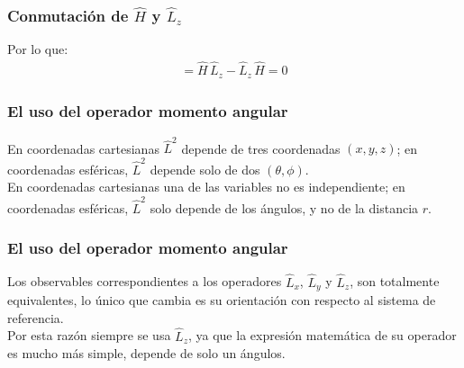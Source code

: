\begin{frame}
\frametitle{Conmutación de $\hat{H}$ y $\hat{L}_{z}$}
Por lo que:
\begin{align*}
[\hat{H}, \hat{L}_{z}] = \hat{H} \, \hat{L}_{z} - \hat{L}_{z} \, \hat{H} = 0
\end{align*}
\end{frame}
\begin{frame}
\frametitle{El uso del operador momento angular}
En coordenadas cartesianas $\hat{L}^{2}$ depende de tres coordenadas $(x, y, z)$; en coordenadas esféricas, $\hat{L}^{2}$ depende solo de dos $(\theta, \phi)$.
\\
\bigskip
\pause
En coordenadas cartesianas una de las variables no es independiente; en coordenadas esféricas, $\hat{L}^{2}$ solo depende de los ángulos, y no de la distancia $r$.
\end{frame}
\begin{frame}
\frametitle{El uso del operador momento angular}
Los observables correspondientes a los operadores $\hat{L}_{x}$, $\hat{L}_{y}$ y $\hat{L}_{z}$, son totalmente equivalentes, lo único que cambia es su orientación con respecto al sistema de referencia.
\\
\bigskip
\pause
Por esta razón siempre se usa $\hat{L}_{z}$, ya que la expresión matemática de su operador es mucho más simple, depende de solo un ángulos.
\end{frame}
